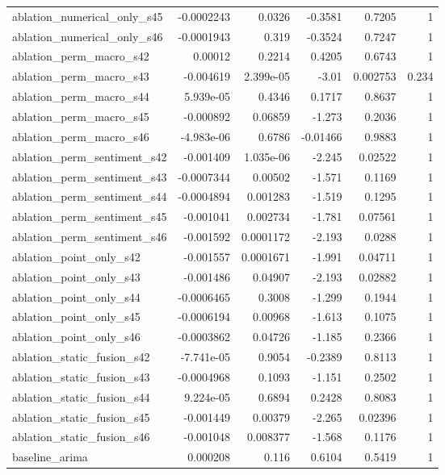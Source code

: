 \begin{table}
\begin{tabular}{lrrrrr}
ablation_numerical_only_s45 & -0.0002243 & 0.0326 & -0.3581 & 0.7205 & 1 \\
ablation_numerical_only_s46 & -0.0001943 & 0.319 & -0.3524 & 0.7247 & 1 \\
ablation_perm_macro_s42 & 0.00012 & 0.2214 & 0.4205 & 0.6743 & 1 \\
ablation_perm_macro_s43 & -0.004619 & 2.399e-05 & -3.01 & 0.002753 & 0.234 \\
ablation_perm_macro_s44 & 5.939e-05 & 0.4346 & 0.1717 & 0.8637 & 1 \\
ablation_perm_macro_s45 & -0.000892 & 0.06859 & -1.273 & 0.2036 & 1 \\
ablation_perm_macro_s46 & -4.983e-06 & 0.6786 & -0.01466 & 0.9883 & 1 \\
ablation_perm_sentiment_s42 & -0.001409 & 1.035e-06 & -2.245 & 0.02522 & 1 \\
ablation_perm_sentiment_s43 & -0.0007344 & 0.00502 & -1.571 & 0.1169 & 1 \\
ablation_perm_sentiment_s44 & -0.0004894 & 0.001283 & -1.519 & 0.1295 & 1 \\
ablation_perm_sentiment_s45 & -0.001041 & 0.002734 & -1.781 & 0.07561 & 1 \\
ablation_perm_sentiment_s46 & -0.001592 & 0.0001172 & -2.193 & 0.0288 & 1 \\
ablation_point_only_s42 & -0.001557 & 0.0001671 & -1.991 & 0.04711 & 1 \\
ablation_point_only_s43 & -0.001486 & 0.04907 & -2.193 & 0.02882 & 1 \\
ablation_point_only_s44 & -0.0006465 & 0.3008 & -1.299 & 0.1944 & 1 \\
ablation_point_only_s45 & -0.0006194 & 0.00968 & -1.613 & 0.1075 & 1 \\
ablation_point_only_s46 & -0.0003862 & 0.04726 & -1.185 & 0.2366 & 1 \\
ablation_static_fusion_s42 & -7.741e-05 & 0.9054 & -0.2389 & 0.8113 & 1 \\
ablation_static_fusion_s43 & -0.0004968 & 0.1093 & -1.151 & 0.2502 & 1 \\
ablation_static_fusion_s44 & 9.224e-05 & 0.6894 & 0.2428 & 0.8083 & 1 \\
ablation_static_fusion_s45 & -0.001449 & 0.00379 & -2.265 & 0.02396 & 1 \\
ablation_static_fusion_s46 & -0.001048 & 0.008377 & -1.568 & 0.1176 & 1 \\
baseline_arima & 0.000208 & 0.116 & 0.6104 & 0.5419 & 1 \\

\end{tabular}
\end{table}

